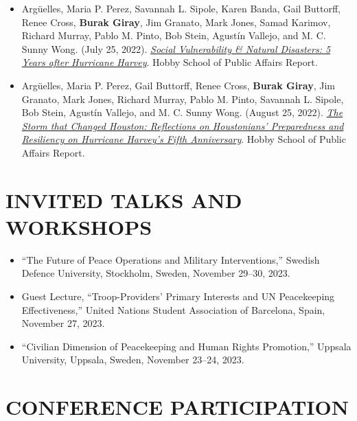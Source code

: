 \documentclass[11pt,a4paper,roman]{moderncv}
\begin{document}
\begin{itemize}
  \item Arg{\"u}elles, Maria P. Perez, Savannah L. Sipole, Karen Banda, Gail Buttorff, Renee Cross, \textbf{Burak Giray}, Jim Granato, Mark Jones, Samad Karimov, Richard Murray, Pablo M. Pinto, Bob Stein, Agust{\'i}n Vallejo, and M. C. Sunny Wong. (July 25, 2022). \href{http://m2s-conf.uh.edu/hobby/harvey/harvey_4_vulnerability_report_final.pdf}{\textit{Social Vulnerability \& Natural Disasters: 5 Years after Hurricane Harvey}}. Hobby School of Public Affairs Report.
  \item Arg{\"u}elles, Maria P. Perez, Gail Buttorff, Renee Cross, \textbf{Burak Giray}, Jim Granato, Mark Jones, Richard Murray, Pablo M. Pinto, Savannah L. Sipole, Bob Stein, Agust{\'i}n Vallejo, and M. C. Sunny Wong. (August 25, 2022). \href{http://m2s-conf.uh.edu/hobby/harvey/harvey_5_report.pdf}{\textit{The Storm that Changed Houston: Reflections on Houstonians' Preparedness and Resiliency on Hurricane Harvey's Fifth Anniversary}}. Hobby School of Public Affairs Report.
\end{itemize}

\section{INVITED TALKS AND WORKSHOPS}

\begin{itemize}
  \item ``The Future of Peace Operations and Military Interventions,'' Swedish Defence University, Stockholm, Sweden, November 29--30, 2023.
  \item Guest Lecture, ``Troop-Providers' Primary Interests and UN Peacekeeping Effectiveness,'' United Nations Student Association of Barcelona, Spain, November 27, 2023.
  \item ``Civilian Dimension of Peacekeeping and Human Rights Promotion,'' Uppsala University, Uppsala, Sweden, November 23--24, 2023.
\end{itemize}

\section{CONFERENCE PARTICIPATION}
\end{document}
